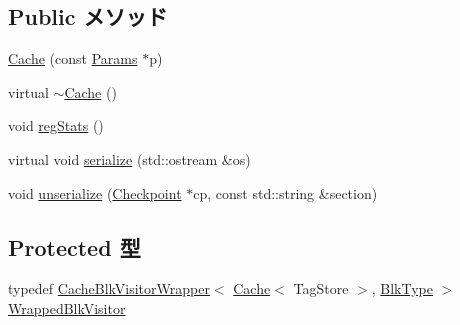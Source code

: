 \subsection*{Public メソッド}
\begin{DoxyCompactItemize}
\item 
\hyperlink{classCache_a82f0d3b81dc0dc573633d0634508218a}{Cache} (const \hyperlink{classBaseCache_a23c1728f4d2cabb1996560194937d427}{Params} $\ast$p)
\item 
virtual \hyperlink{classCache_a899b8bf120ecc87b59e142f00b2987b0}{$\sim$Cache} ()
\item 
void \hyperlink{classCache_a4dc637449366fcdfc4e764cdf12d9b11}{regStats} ()
\item 
virtual void \hyperlink{classCache_a53e036786d17361be4c7320d39c99b84}{serialize} (std::ostream \&os)
\item 
void \hyperlink{classCache_af22e5d6d660b97db37003ac61ac4ee49}{unserialize} (\hyperlink{classCheckpoint}{Checkpoint} $\ast$cp, const std::string \&section)
\end{DoxyCompactItemize}
\subsection*{Protected 型}
\begin{DoxyCompactItemize}
\item 
typedef \hyperlink{classCacheBlkVisitorWrapper}{CacheBlkVisitorWrapper}$<$ \hyperlink{classCache}{Cache}$<$ TagStore $>$, \hyperlink{classCache_a10db52a1c10bfd238e0e3d37c4560495}{BlkType} $>$ \hyperlink{classCache_afe5f62b7007c3a3cf9170e85041b38d8}{WrappedBlkVisitor}
\end{DoxyCompactItemize}
